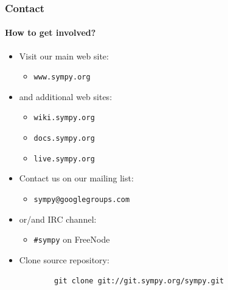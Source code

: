 \documentclass{beamer}
\begin{document}
\begin{frame}[fragile]
    \frametitle{Contact}
    \framesubtitle{How to get involved?}

    \begin{itemize}
        \item Visit our main web site:
            \begin{itemize}
                \item \texttt{www.sympy.org}
            \end{itemize}
        \item and additional web sites:
            \begin{itemize}
                \item \texttt{wiki.sympy.org}
                \item \texttt{docs.sympy.org}
                \item \texttt{live.sympy.org}
            \end{itemize}
        \item Contact us on our mailing list:
            \begin{itemize}
                \item \texttt{sympy@googlegroups.com}
            \end{itemize}
        \item or/and IRC channel:
            \begin{itemize}
                \item \texttt{\#sympy} on FreeNode
            \end{itemize}
        \item Clone source repository:
        \begin{verbatim}
        git clone git://git.sympy.org/sympy.git
        \end{verbatim}
    \end{itemize}
\end{frame}
\end{document}
